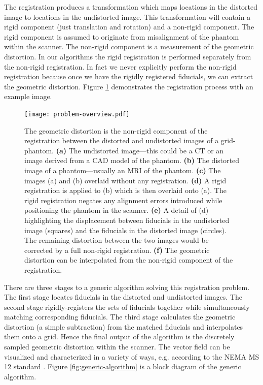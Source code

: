 \documentclass[12pt]{article}
\begin{document}
The registration produces a transformation which maps locations in the distorted image to locations in the undistorted image.  This transformation will contain a rigid component (just translation and rotation) and a non-rigid component.  The rigid component is assumed to originate from misalignment of the phantom within the scanner.  The non-rigid component is a measurement of the geometric distortion.  In our algorithms the rigid registration is performed separately from the non-rigid registration.  In fact we never explicitly perform the non-rigid registration because once we have the rigidly registered fiducials, we can extract the geometric distortion.  Figure \ref{fig:problem-overview} demonstrates the registration process with an example image.

\begin{figure}
    \centering
    \texttt{[image: problem-overview.pdf]}
    \caption{The geometric distortion is the non-rigid component of the registration between the distorted and undistorted images of a grid-phantom. \textbf{(a)} The undistorted image---this could be a CT or an image derived from a CAD model of the phantom.  \textbf{(b)} The distorted image of a phantom---usually an MRI of the phantom.  \textbf{(c)} The images (a) and (b) overlaid without any registration.  \textbf{(d)} A rigid registration is applied to (b) which is then overlaid onto (a).  The rigid registration negates any alignment errors introduced while positioning the phantom in the scanner. \textbf{(e)} A detail of (d) highlighting the displacement between fiducials in the undistorted image (squares) and the fiducials in the distorted image (circles).  The remaining distortion between the two images would be corrected by a full non-rigid registration. \textbf{(f)} The geometric distortion can be interpolated from the non-rigid component of the registration.}
    \label{fig:problem-overview}
\end{figure}

There are three stages to a generic algorithm solving this registration problem.  The first stage locates fiducials in the distorted and undistorted images.  The second stage rigidly-registers the sets of fiducials together while simultaneously matching corresponding fiducials.  The third stage calculates the geometric distortion (a simple subtraction) from the matched fiducials and interpolates them onto a grid.  Hence the final output of the algorithm is the discretely sampled geometric distortion within the scanner.  The vector field can be visualized and characterized in a variety of ways, e.g. according to the NEMA MS 12 standard \cite{nema2010}.  Figure \ref{fig:generic-algorithm} is a block diagram of the generic algorithm.
\end{document}
